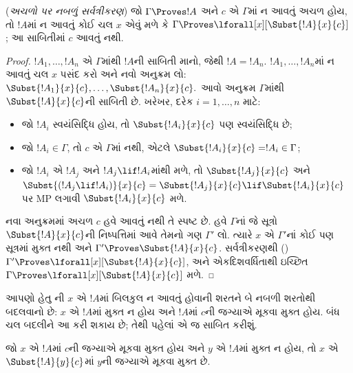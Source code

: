 \begin{thm} (\emph{અચળો પર નબળું સર્વત્રીકરણ})
જો $\Gamma \Proves !A$ અને $c$ એ $\Gamma$માં
ન આવતું અચળ હોય, તો $!A$માં
ન આવતું કોઈ ચલ $x$ એવું મળે કે
$\Gamma \Proves \lforall[x][\Subst{!A}{x}{c}]$;
આ સાબિતીમાં $c$ આવતું નથી.
\end{thm}

\begin{proof} $!A_1,\ldots,!A_n$ એ $\Gamma$માંથી
$!A$ની સાબિતી માનો, જેથી $!A=!A_n$.
$!A_1,\ldots,!A_n$માં ન આવતું
ચલ $x$ પસંદ કરો અને
નવો અનુક્રમ લો:
$\Subst{!A_1}{x}{c},\ldots,\Subst{!A_n}{x}{c}.$
આવો અનુક્રમ $\Gamma$માંથી
$\Subst{!A}{x}{c}$ની સાબિતી છે.
ખરેખર, દરેક $i=1,\ldots,n$ માટે:
\begin{itemize}
\item જો $!A_i$ સ્વયંસિદ્ધિ હોય, તો
$\Subst{!A_i}{x}{c}$ પણ સ્વયંસિદ્ધિ છે;
\item જો $!A_i \in \Gamma$, તો
$c$ એ $\Gamma$માં નથી,
એટલે $\Subst{!A_i}{x}{c} = !A_i \in \Gamma$;
\item જો $!A_i$ એ $!A_j$
અને $!A_j \lif !A_i$માંથી મળે,
તો $\Subst{!A_j}{x}{c}$ અને
$\Subst{(!A_j \lif !A_i)}{x}{c}
= \Subst{!A_j}{x}{c} \lif \Subst{!A_i}{x}{c}$
પર MP લગાવી $\Subst{!A_i}{x}{c}$ મળે.
\end{itemize}
નવા અનુક્રમમાં અચળ $c$
હવે આવતું નથી તે સ્પષ્ટ છે.
હવે $\Gamma$નાં જે સૂત્રો
$\Subst{!A}{x}{c}$ની નિષ્પત્તિમાં
આવે તેમનો ગણ $\Gamma'$ લો.
ત્યારે $x$ એ $\Gamma'$નાં
કોઈ પણ સૂત્રમાં મુક્ત નથી
અને $\Gamma' \Proves \Subst{!A}{x}{c}$.
સર્વત્રીકરણથી
()
$\Gamma' \Proves \lforall[x][\Subst{!A}{x}{c}]$,
અને એકદિશવર્ધિતાથી ઇચ્છિત
$\Gamma \Proves \lforall[x][\Subst{!A}{x}{c}]$ મળે.
\end{proof}

\begin{explain}
આપણો હેતુ ની
$x$ એ $!A$માં બિલકુલ ન આવતું
હોવાની શરતને બે નબળી શરતોથી
બદલવાનો છે: $x$ એ $!A$માં
મુક્ત ન હોય અને $!A$માં
$c$ની જગ્યાએ મૂકવા મુક્ત
હોય. બંધ ચલ બદલીને
આ કરી શકાય છે; તેથી પહેલાં
એ જ સાબિત કરીશું.
\end{explain}

\begin{lem}
જો $x$ એ $!A$માં $c$ની જગ્યાએ
મૂકવા મુક્ત હોય અને $y$ એ $!A$માં
મુક્ત ન હોય, તો $x$ એ
$\Subst{!A}{y}{c}$માં $y$ની
જગ્યાએ મૂકવા મુક્ત છે.
\end{lem}

